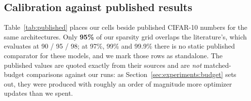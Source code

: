 \subsection{Calibration against published results}

Table~\ref{tab:published} places our cells beside published CIFAR-10 numbers for
the same architectures. Only \textbf{95\%} of our sparsity grid overlaps the
literature's, which evaluates at 90 / 95 / 98; at 97\%, 99\% and 99.9\% there is
no static published comparator for these models, and we mark those rows as
standalone. The published values are quoted exactly from their sources and are
\emph{not} matched-budget comparisons against our runs: as
Section~\ref{sec:experiments:budget} sets out, they were produced with roughly an
order of magnitude more optimizer updates than we spent.

